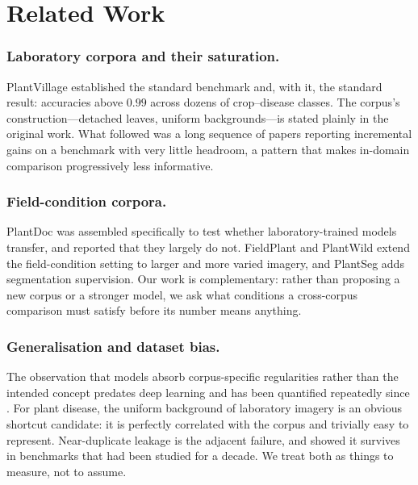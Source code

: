 \documentclass[runningheads]{llncs}
\begin{document}
\section{Related Work}

\subsubsection{Laboratory corpora and their saturation.}
PlantVillage \cite{mohanty2016plantvillage} established the standard benchmark
and, with it, the standard result: accuracies above $0.99$ across dozens of
crop--disease classes. The corpus's construction---detached leaves, uniform
backgrounds---is stated plainly in the original work. What followed was a long
sequence of papers reporting incremental gains on a benchmark with very little
headroom, a pattern that makes in-domain comparison progressively less
informative.

\subsubsection{Field-condition corpora.}
PlantDoc \cite{singh2020plantdoc} was assembled specifically to test whether
laboratory-trained models transfer, and reported that they largely do not.
FieldPlant \cite{moupojou2023fieldplant} and PlantWild \cite{wei2024plantwild}
extend the field-condition setting to larger and more varied imagery, and
PlantSeg \cite{wei2025plantseg} adds segmentation supervision. Our work is
complementary: rather than proposing a new corpus or a stronger model, we ask
what conditions a cross-corpus comparison must satisfy before its number means
anything.

\subsubsection{Generalisation and dataset bias.}
The observation that models absorb corpus-specific regularities rather than the
intended concept predates deep learning \cite{torralba2011bias} and has been
quantified repeatedly since \cite{recht2019imagenet,geirhos2020shortcut}. For
plant disease, the uniform background of laboratory imagery is an obvious
shortcut candidate: it is perfectly correlated with the corpus and trivially
easy to represent. Near-duplicate leakage is the adjacent failure, and
\cite{barz2020purging} showed it survives in benchmarks that had been studied
for a decade. We treat both as things to measure, not to assume.
\end{document}
